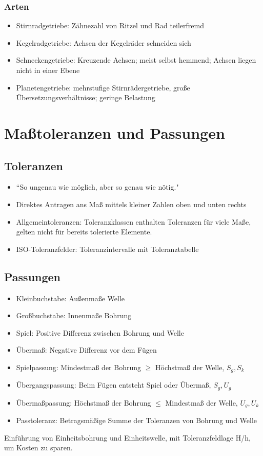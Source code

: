 \documentclass[a4paper,parskip=half*,DIV=7,fontsize=11pt]{scrartcl}
\begin{document}
\subsubsection{Arten}
\begin{itemize}
	\item Stirnradgetriebe: Zähnezahl von Ritzel und Rad teilerfremd
	\item Kegelradgetriebe: Achsen der Kegelräder schneiden sich
	\item 	Schneckengetriebe: Kreuzende Achsen; meist selbst hemmend; Achsen liegen nicht in einer Ebene
	\item 	Planetengetriebe: mehrstufige Stirnrädergetriebe, große Übersetzungsverhältnisse; geringe Belastung
\end{itemize}	
	
\section{Maßtoleranzen und Passungen}
\subsection{Toleranzen}
\begin{itemize}
	\item ``So ungenau wie möglich, aber so genau wie nötig."
	\item Direktes Antragen ans Maß mittels kleiner Zahlen oben und unten rechts
	\item Allgemeintoleranzen: Toleranzklassen enthalten Toleranzen für viele Maße, gelten nicht für bereits tolerierte Elemente.
	\item ISO-Toleranzfelder: Toleranzintervalle mit Toleranztabelle
\end{itemize}
	
\subsection{Passungen}
\begin{itemize}
	\item Kleinbuchstabe: Außenmaße Welle
	\item Großbuchstabe: Innenmaße Bohrung
	\item Spiel: Positive Differenz zwischen Bohrung und Welle
	\item Übermaß: Negative Differenz vor dem Fügen
	\item Spielpassung: Mindestmaß der Bohrung $\geq$ Höchstmaß der Welle, $S_g,S_k$
	\item Übergangspassung: Beim Fügen entsteht Spiel oder Übermaß, $S_g,U_g$
	\item Übermaßpassung: Höchstmaß der Bohrung $\leq$ Mindestmaß der Welle, $U_g,U_k$
	\item Passtoleranz: Betragsmäßige Summe der Toleranzen von Bohrung und Welle
\end{itemize}
Einführung von Einheitsbohrung und Einheitswelle, mit Toleranzfeldlage H/h, um Kosten zu sparen. 
	
\end{document}
